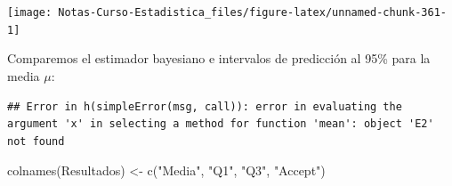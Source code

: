 \documentclass[
  12pt,
]{book}
\newenvironment{Shaded}{\begin{snugshade}}{\end{snugshade}}
\newcommand{\AttributeTok}[1]{\textcolor[rgb]{0.77,0.63,0.00}{#1}}
\newcommand{\ConstantTok}[1]{\textcolor[rgb]{0.00,0.00,0.00}{#1}}
\newcommand{\DecValTok}[1]{\textcolor[rgb]{0.00,0.00,0.81}{#1}}
\newcommand{\FloatTok}[1]{\textcolor[rgb]{0.00,0.00,0.81}{#1}}
\newcommand{\FunctionTok}[1]{\textcolor[rgb]{0.00,0.00,0.00}{#1}}
\newcommand{\NormalTok}[1]{#1}
\newcommand{\OtherTok}[1]{\textcolor[rgb]{0.56,0.35,0.01}{#1}}
\newcommand{\SpecialCharTok}[1]{\textcolor[rgb]{0.00,0.00,0.00}{#1}}
\newcommand{\StringTok}[1]{\textcolor[rgb]{0.31,0.60,0.02}{#1}}
\theoremstyle{definition}
\theoremstyle{definition}
\theoremstyle{definition}
\theoremstyle{definition}
\theoremstyle{remark}
\begin{document}
\begin{center}\texttt{[image: Notas-Curso-Estadistica\_files/figure-latex/unnamed-chunk-361-1]} \end{center}

Comparemos el estimador bayesiano e intervalos de predicción al 95\% para la media \(\mu\):

\begin{Shaded}
\end{Shaded}

\begin{verbatim}
## Error in h(simpleError(msg, call)): error in evaluating the argument 'x' in selecting a method for function 'mean': object 'E2' not found
\end{verbatim}

\begin{Shaded}
\begin{Highlighting}[]
\FunctionTok{colnames}\NormalTok{(Resultados) }\OtherTok{\textless{}{-}} \FunctionTok{c}\NormalTok{(}\StringTok{"Media"}\NormalTok{, }\StringTok{"Q1"}\NormalTok{, }\StringTok{"Q3"}\NormalTok{, }\StringTok{"Accept"}\NormalTok{)}
\end{Highlighting}
\end{Shaded}
\end{document}
